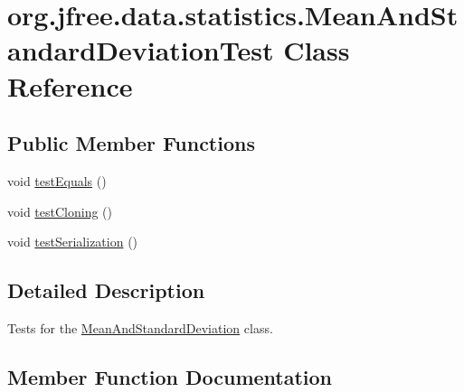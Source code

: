 \hypertarget{classorg_1_1jfree_1_1data_1_1statistics_1_1_mean_and_standard_deviation_test}{}\section{org.\+jfree.\+data.\+statistics.\+Mean\+And\+Standard\+Deviation\+Test Class Reference}
\label{classorg_1_1jfree_1_1data_1_1statistics_1_1_mean_and_standard_deviation_test}
\subsection*{Public Member Functions}
\begin{DoxyCompactItemize}
\item 
void \mbox{\hyperlink{classorg_1_1jfree_1_1data_1_1statistics_1_1_mean_and_standard_deviation_test_a5b6bc6e9a1cc06e7bbddb14742109746}{test\+Equals}} ()
\item 
void \mbox{\hyperlink{classorg_1_1jfree_1_1data_1_1statistics_1_1_mean_and_standard_deviation_test_a0b40ea6a7a41baaf0956acaadd337bbe}{test\+Cloning}} ()
\item 
void \mbox{\hyperlink{classorg_1_1jfree_1_1data_1_1statistics_1_1_mean_and_standard_deviation_test_a24cb9278f9ddae27a6643341d6119146}{test\+Serialization}} ()
\end{DoxyCompactItemize}


\subsection{Detailed Description}
Tests for the \mbox{\hyperlink{classorg_1_1jfree_1_1data_1_1statistics_1_1_mean_and_standard_deviation}{Mean\+And\+Standard\+Deviation}} class. 

\subsection{Member Function Documentation}
\mbox{\label{classorg_1_1jfree_1_1data_1_1statistics_1_1_mean_and_standard_deviation_test_a0b40ea6a7a41baaf0956acaadd337bbe}} 
